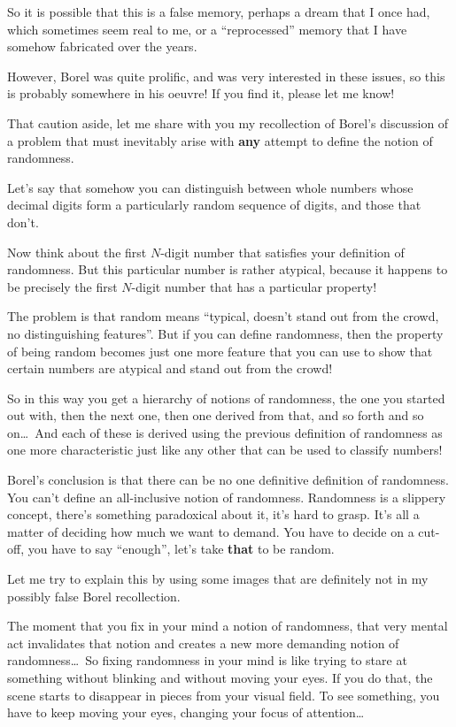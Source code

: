 \documentclass[12pt]{book}
\begin{document}
So it is possible that this is a false memory, perhaps a dream that I once had, which
sometimes seem real to me, or a ``reprocessed'' memory that I have somehow fabricated
over the years.  
 
However, Borel was quite prolific, and was very interested in these issues,
so this is probably somewhere in his oeuvre!
If you find it, please let me know!
 
That caution aside, let me share with you my recollection of Borel's discussion
of a problem that must inevitably arise with \textbf{any} attempt to define the notion
of randomness.
 
Let's say that somehow you can distinguish between whole numbers whose decimal digits
form a particularly random sequence of digits, and those that don't.
 
Now think about the first $N$-digit number that satisfies your definition of randomness.
But this particular number is rather atypical, because it happens to be precisely
the first $N$-digit number that has a particular property!
 
The problem is that random means ``typical, doesn't stand out from the crowd, no distinguishing
features''.  But if you can define randomness, then the property of being random becomes 
just one more feature that you can use to show that certain numbers are atypical and
stand out from the crowd!
 
So in this way you get a hierarchy of notions of randomness, the one you started out with, then
the next one, then one derived from that, and so forth and so on\ldots\  And each of these
is derived using the previous definition of randomness as one more characteristic
just like any other that can be used to classify numbers!
 
Borel's conclusion is that there can be no one definitive definition of randomness.
You can't define an all-inclusive notion of randomness.
Randomness is a slippery concept, there's something paradoxical about it, it's hard to grasp.
It's all a matter of deciding how much we want to demand. You have to decide on a cut-off, 
you have to say ``enough'', let's take \textbf{that} to be random.
 
Let me try to explain this by using some images that are definitely not in my 
possibly false Borel recollection.
 
The moment that you fix in your mind a notion of randomness, that very mental act invalidates
that notion and creates a new more demanding notion of randomness\ldots\
So fixing randomness in your mind is like trying to stare at something without blinking
and without moving your eyes.  If you do that, the scene starts to disappear
in pieces from your visual field.  To see something, you have to keep moving your eyes,
changing your focus of attention\ldots
 
\end{document}
